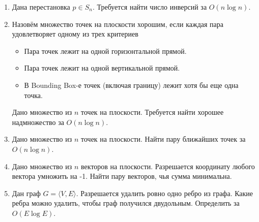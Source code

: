 \begin{enumerate}
  \item Дана перестановка $p \in S_n$. Требуется найти число инверсий за $O(n \log n)$.

  \item Назовём множество точек на плоскости хорошим, если каждая пара удовлетворяет
        одному из трех критериев
        \begin{itemize}
          \item Пара точек лежит на одной горизонтальной прямой.
          \item Пара точек лежит на одной вертикальной прямой.
          \item В Bounding Box-е точек (включая границу) лежит хотя бы еще одна точка.
        \end{itemize}
        Дано множество из $n$ точек на плоскости. Требуется
        найти хорошее надмножество за $O(n \log n)$.

  \item Дано множество из $n$ точек на плоскости. Найти пару
        ближайших точек за $O(n \log n)$.
  
  \item Дано множество из $n$ векторов на плоскости. Разрешается
      координату любого вектора умножить на -1. Найти пару
      векторов, чья сумма минимальна.


  \item Дан граф $G = \langle V, E \rangle$. Разрешается удалить
      ровно одно ребро из графа. Какие ребра можно удалить, чтобы
      граф получился двудольным. Определить за $O(E \log E)$.

\end{enumerate}
